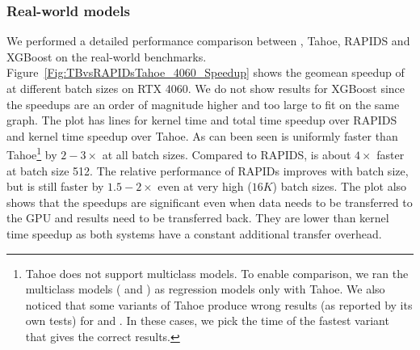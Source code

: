 \subsubsection*{Real-world models}
We performed a detailed performance comparison between \Treebeard{}, Tahoe, RAPIDS and XGBoost on the real-world benchmarks.
Figure~\ref{Fig:TBvsRAPIDsTahoe_4060_Speedup} shows the geomean speedup of \Treebeard{} at different batch sizes on RTX 4060. 
We do not show results for XGBoost since the speedups are an order of magnitude higher and too large to fit on the same graph.  
The plot has lines for kernel time and total time speedup over RAPIDS and kernel time speedup over Tahoe. As can been seen 
\Treebeard{} is uniformly faster than Tahoe{\footnote{Tahoe does not support multiclass models. To enable comparison, we ran 
the multiclass models ( and ) as regression models only with Tahoe. We also noticed that some variants
of Tahoe produce wrong results (as reported by its own tests) for  and . In these cases, we pick the 
time of the fastest variant that gives the correct results.}} by $2-3\times$ at all batch sizes. 
Compared to RAPIDS, \Treebeard{} is about $4\times$ faster at batch size 512. The relative performance of RAPIDs improves 
with batch size, but \Treebeard{} is still faster by $1.5-2\times$ even at very high ($16K$) batch sizes. 
The plot also shows that the speedups are significant even when data needs to be transferred to the GPU and results need to
be transferred back. They are lower than kernel time speedup as both systems have a constant additional transfer overhead.
 
